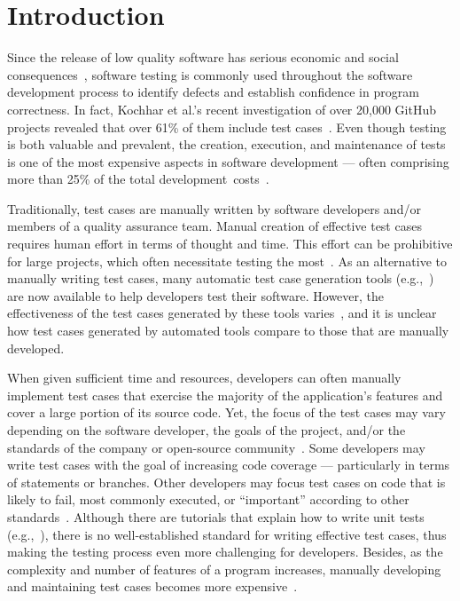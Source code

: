 

\section{Introduction}

Since the release of low quality software has serious economic and social
consequences~\cite{tassey2002}, software testing is commonly used throughout the
software development process to identify defects and establish confidence in
program correctness. In fact, Kochhar et al.'s recent investigation of over
20,000 GitHub projects revealed that over 61\% of them include test
cases~\cite{kochhar2013}.  Even though testing is both valuable and prevalent,
the creation, execution, and maintenance of tests is one of the most expensive
aspects in software development --- often comprising more than 25\% of the total
\mbox{development costs~\cite{vizard2013}.}

Traditionally, test cases are manually written by software developers and/or
members of a quality assurance team.  Manual creation of effective test cases
requires human effort in terms of thought and time.  This effort can be
prohibitive for large projects, which often necessitate testing the
most~\cite{kochhar2013}.  As an alternative to manually writing test cases, many
automatic test case generation tools
(e.g.,~\cite{fraser:2011:eat:2025113.2025179,pacheco2007feedback,csallner2004})
are now available to help developers test their software.  However, the
effectiveness of the test cases generated by these tools
varies~\cite{bacchelli2008,fraser2013c,fraser2013a}, and it is unclear how test
cases generated by automated tools compare to those that are manually developed.

When given sufficient time and resources, developers can often manually
implement test cases that exercise the majority of the application's features
and cover a large portion of its source code.  Yet, the focus of the test cases
may vary depending on the software developer, the goals of the project, and/or
the standards of the company or open-source community~\cite{kochhar2013}.  Some
developers may write test cases with the goal of increasing code coverage ---
particularly in terms of statements or branches.  Other developers may focus
test cases on code that is likely to fail, most commonly executed, or
``important'' according to other standards~\cite{mockus2009}. 
Although there are tutorials that explain how to write unit tests
(e.g.,~\cite{vogella2013}), there is no well-established standard for writing
effective test cases, thus making the testing process even more challenging for
developers.  Besides, as the complexity and number of features of a program
increases, manually developing and maintaining test cases becomes more
expensive~\cite{clarke1998automated}.  

